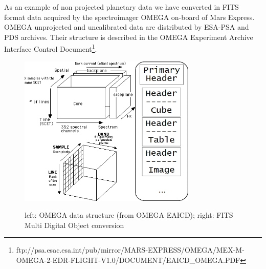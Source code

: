 As an example of non projected planetary data we have converted in FITS format data
acquired by the spectroimager OMEGA on-board of Mars Express.
OMEGA unprojected and uncalibrated data are distributed by ESA-PSA and PDS archives.
Their structure is described in the OMEGA Experiment Archive 
Interface Control Document\footnote{ftp://psa.esac.esa.int/pub/mirror/MARS-EXPRESS/OMEGA/MEX-M-OMEGA-2-EDR-FLIGHT-V1.0/DOCUMENT/EAICD\_OMEGA.PDF}.
\begin{figure}[ht!]
\centerline{\includegraphics[height=17pc]{ess_marmo4}\hspace{60pt}\includegraphics[height=17pc]{ess_marmo3}}
\caption{left: OMEGA data structure (from OMEGA EAICD); right: FITS Multi Digital Object
conversion}
\label{fig:omegascheme}
\end{figure}

